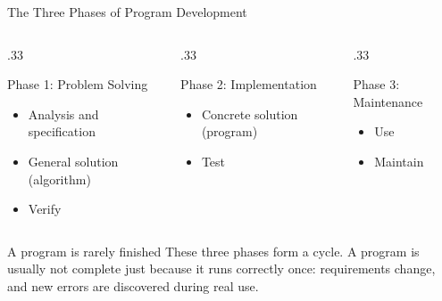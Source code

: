 \documentclass[9pt,aspectratio=169,xcolor=table]{beamer}
\begin{document}
\begin{frame}{The Three Phases of Program Development}
    \leavevmode
    \small
    \begin{columns}[t]
        \begin{column}{.33\textwidth}
            \begin{block}{Phase 1: Problem Solving}
                \scriptsize
                \begin{itemize}
                    \item Analysis and specification
                    \item General solution (algorithm)
                    \item Verify
                \end{itemize}
            \end{block}
        \end{column}
        \begin{column}{.33\textwidth}
            \begin{block}{Phase 2: Implementation}
                \scriptsize
                \begin{itemize}
                    \item Concrete solution (program)
                    \item Test
                \end{itemize}
            \end{block}
        \end{column}
        \begin{column}{.33\textwidth}
            \begin{block}{Phase 3: Maintenance}
                \scriptsize
                \begin{itemize}
                    \item Use
                    \item Maintain
                \end{itemize}
            \end{block}
        \end{column}
    \end{columns}

    \vspace{3mm}
    \begin{alertblock}{A program is rarely finished}
        These three phases form a cycle. A program is usually not
        complete just because it runs correctly once: requirements
        change, and new errors are discovered during real use.
    \end{alertblock}
\end{frame}
\end{document}
